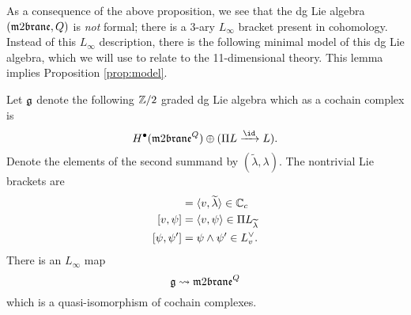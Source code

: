 \documentclass[11pt]{amsart}
\begin{document}
\parsec[]

As a consequence of the above proposition, we see that the dg Lie algebra $(\m2,Q)$ is {\em not} formal; there is a 3-ary $L_\infty$ bracket present in cohomology. 
Instead of this $L_\infty$ description, there is the following minimal model of this dg Lie algebra, which we will use to relate to the 11-dimensional theory. 
This lemma implies Proposition \ref{prop:model}.

\begin{lem}
\label{lem:gmodel}
Let $\mathfrak g$ denote the following $\mathbb Z/2$ graded dg Lie algebra which as a cochain complex is
\[
H^\bu(\m2^Q) \oplus (\Pi L \xto{\id} L)  .
\]
Denote the elements of the second summand by $(\tilde{\lambda}, \lambda)$. 
The nontrivial Lie brackets are
\begin{align*}
[v,\lambda] & = \<v, \til\lambda\> \in \CC_c \\ 
[v,\psi] & = \<v, \psi\> \in \Pi L_{\Tilde{\lambda}} \\
[\psi, \psi'] & = \psi \wedge \psi' \in L^\vee_v  .
\end{align*}
There is an $L_\infty$ map 
\[
\fg \rightsquigarrow \m2^Q
\] 
which is a quasi-isomorphism of cochain complexes.  
\end{lem}
\end{document}
